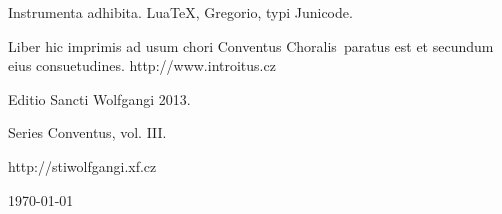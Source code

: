 \documentclass[a4paper, twoside, 12pt]{article}
\newcommand{\annusEditionis}{2013}
\begin{document}
Instrumenta adhibita.
LuaTeX, %
Gregorio, %
typi Junicode. %

\begin{center}
Liber hic imprimis ad usum chori 
\guillemotright Conventus Choralis\guillemotleft\ 
paratus est
et secundum eius consuetudines.
http://www.introitus.cz

\vspace{1cm}

{\large Editio Sancti Wolfgangi \annusEditionis .}

\vspace{2mm}

Series \guillemotright Conventus\guillemotleft, vol. III.

\vspace{1cm}

http://stiwolfgangi.xf.cz

\vfill

\today

\end{center}
\end{document}
